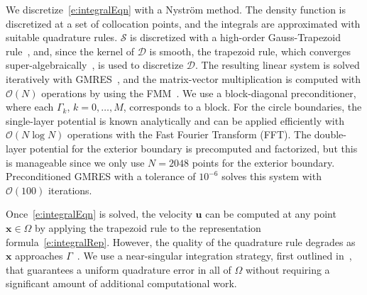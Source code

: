 \documentclass[onecolumn,showpacs,pre,preprintnumbers,floatfix]{revtex4-1}
\newcommand{\bigO}{\mathcal{O}}
\newcommand{\DD}{\mathcal{D}}
\renewcommand{\SS}{\mathcal{S}}
\newcommand{\uu}{\mathbf{u}}
\newcommand{\xx}{\mathbf{x}}
\begin{document}
We discretize~\eqref{e:integralEqn} with a Nystr\"{o}m method.  The
density function is discretized at a set of collocation points, and the
integrals are approximated with suitable quadrature rules.  $\SS$ is
discretized with a high-order Gauss-Trapezoid rule~\cite{alp1999}, and,
since the kernel of $\DD$ is smooth, the trapezoid rule, which
converges super-algebraically~\cite{tre:wei2014}, is used to discretize
$\DD$.  The resulting linear system is solved iteratively with
GMRES~\cite{saa:sch1986}, and the matrix-vector multiplication is
computed with $\bigO(N)$ operations by using the FMM~\cite{cmcl2012}.
We use a block-diagonal preconditioner, where each $\Gamma_{k}$,
$k=0,\ldots,M$, corresponds to a block.  For the circle boundaries, the
single-layer potential is known analytically and can be applied
efficiently with $\bigO(N \log N)$ operations with the Fast Fourier
Transform (FFT).  The double-layer potential for the exterior boundary
is precomputed and factorized, but this is manageable since we only use
$N=2048$ points for the exterior boundary.  Preconditioned GMRES with a
tolerance of $10^{-6}$ solves this system with $\bigO(100)$ iterations.

Once~\eqref{e:integralEqn} is solved, the velocity $\uu$ can be
computed at any point $\xx \in \Omega$ by applying the trapezoid rule
to the representation formula~\eqref{e:integralRep}.  However, the
quality of the quadrature rule degrades as $\xx$ approaches
$\Gamma$~\cite{bar2014,bar:wu:vee2014}.  We use a near-singular
integration strategy, first outlined in~\cite{bir:yin:zor2004}, that
guarantees a uniform quadrature error in all of $\Omega$ without
requiring a significant amount of additional computational work.


\end{document}
